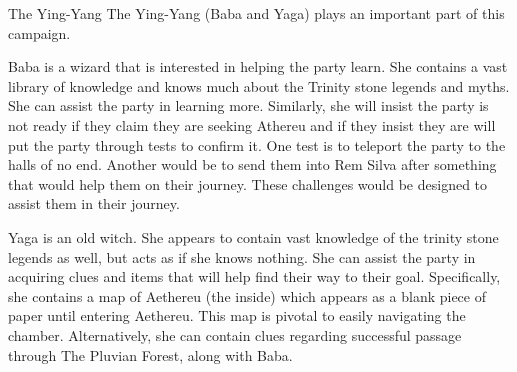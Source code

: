 \begin{commentbox}{The Ying-Yang}
	The Ying-Yang (Baba and Yaga) plays an important part of this campaign. 
	
	Baba is a wizard that is interested in helping the party learn. She contains a vast library of knowledge and knows much about the Trinity stone legends and myths. She can assist the party in learning more. Similarly, she will insist the party is not ready if they claim they are seeking Athereu and if they insist they are will put the party through tests to confirm it. One test is to teleport the party to the halls of no end. Another would be to send them into Rem Silva after something that would help them on their journey. These challenges would be designed to assist them in their journey. 
	
	Yaga is an old witch. She appears to contain vast knowledge of the trinity stone legends as well, but acts as if she knows nothing. She can assist the party in acquiring clues and items that will help find their way to their goal. Specifically, she contains a map of Aethereu (the inside) which appears as a blank piece of paper until entering Aethereu. This map is pivotal to easily navigating the chamber. Alternatively, she can contain clues regarding successful passage through The Pluvian Forest, along with Baba.
\end{commentbox}



